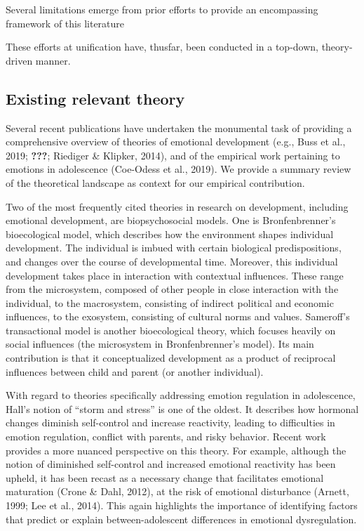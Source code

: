 \documentclass[
  english,
  man]{apa6}
\begin{document}
Several limitations emerge from prior efforts to provide an encompassing framework of this literature

These efforts at unification have, thusfar, been conducted in a top-down, theory-driven manner.

\hypertarget{existing-relevant-theory}{%
\subsection{Existing relevant theory}\label{existing-relevant-theory}}

Several recent publications have undertaken the monumental task of providing a comprehensive overview of theories of emotional development (e.g., Buss et al., 2019; {\textbf{???}}; Riediger \& Klipker, 2014), and of the empirical work pertaining to emotions in adolescence (Coe-Odess et al., 2019). We provide a summary review of the theoretical landscape as context for our empirical contribution.

Two of the most frequently cited theories in research on development, including emotional development, are biopsychosocial models. One is Bronfenbrenner's bioecological model, which describes how the environment shapes individual development. The individual is imbued with certain biological predispositions, and changes over the course of developmental time. Moreover, this individual development takes place in interaction with contextual influences. These range from the microsystem, composed of other people in close interaction with the individual, to the macrosystem, consisting of indirect political and economic influences, to the exosystem, consisting of cultural norms and values. Sameroff's transactional model is another bioecological theory, which focuses heavily on social influences (the microsystem in Bronfenbrenner's model). Its main contribution is that it conceptualized development as a product of reciprocal influences between child and parent (or another individual).

With regard to theories specifically addressing emotion regulation in adolescence, Hall's notion of \enquote{storm and stress} is one of the oldest. It describes how hormonal changes diminish self-control and increase reactivity, leading to difficulties in emotion regulation, conflict with parents, and risky behavior. Recent work provides a more nuanced perspective on this theory. For example, although the notion of diminished self-control and increased emotional reactivity has been upheld, it has been recast as a necessary change that facilitates emotional maturation (Crone \& Dahl, 2012), at the risk of emotional disturbance (Arnett, 1999; Lee et al., 2014). This again highlights the importance of identifying factors that predict or explain between-adolescent differences in emotional dysregulation.
\end{document}
